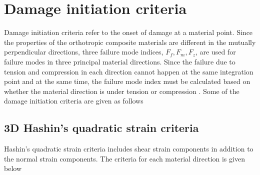 \documentclass[12pt,a4paper,twoside,openright]{report}
\begin{document}
\section{Damage initiation criteria}
\indent\indent\indent   Damage initiation criteria refer to the onset of damage at a material point. Since the properties of the orthotropic composite materials are different in the mutually perpendicular directions, three failure mode indices, $F_{f}, F_{m}, F_{z}$, are used for failure modes in three principal material directions. Since the failure due to tension and compression in each direction cannot happen at the same integration point and at the same time, the failure mode index must be calculated based on whether the material direction is under tension or compression \citep{wang2009three}. Some of the damage initiation criteria are given as follows

\subsection{3D Hashin's quadratic strain criteria}\label{3D Hashin's quadratic strain criteria }
\indent\indent\indent Hashin's quadratic strain criteria \citep{wang2009three} includes shear strain components in addition to the normal strain components. The criteria for each material direction is given below 
\end{document}
